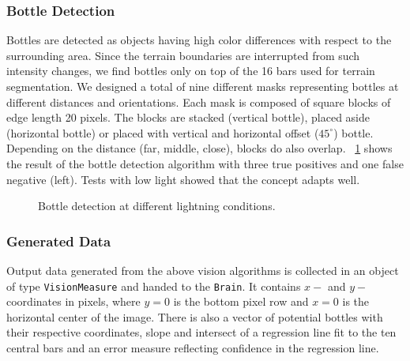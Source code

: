 \subsubsection{Bottle Detection}
Bottles are detected as objects having high color differences with respect to the surrounding
area. Since the terrain boundaries are interrupted from such intensity changes, we find
bottles only on top of the 16 bars used for terrain segmentation. We designed a total of
nine different masks representing bottles at different distances and orientations.
Each mask is composed of square blocks of edge length 20 pixels. The blocks are stacked
(vertical bottle), placed aside (horizontal bottle) or placed with vertical and horizontal
offset ($45^\circ$) bottle. Depending on the distance (far, middle, close), blocks
do also overlap. \figurename~\ref{fig:bottles1} shows the result of the bottle detection
algorithm with three true positives and one false negative (left). Tests with low light
showed that the concept adapts well.

\begin{figure}
\center
{}
\hfill
{}
\label{fig:bottles1}
\caption{Bottle detection at different lightning conditions.}
\end{figure}


\subsubsection{Generated Data}
Output data generated from the above vision algorithms is collected in an object of type
\texttt{VisionMeasure} and handed to the \texttt{Brain}. It contains $x-$ and $y-$coordinates
in pixels, where $y=0$ is the bottom pixel row and $x=0$ is the horizontal center of the
image. There is also a vector of potential bottles with their respective coordinates,
slope and intersect of a regression line fit to the ten central bars and an error measure
reflecting confidence in the regression line.

